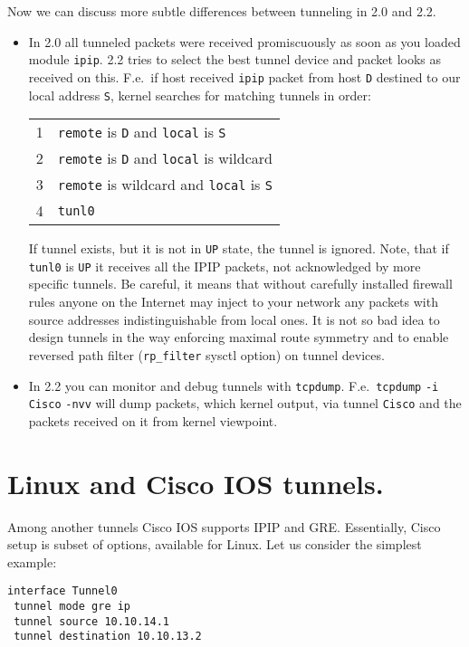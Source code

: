 Now we can discuss more subtle differences between tunneling in 2.0
and 2.2.

\begin{itemize}

\item In 2.0 all tunneled packets were received promiscuously
as soon as you loaded module \verb|ipip|. 2.2 tries to select the best
tunnel device and packet looks as received on this. F.e.\ if host
received \verb|ipip| packet from host \verb|D| destined to our
local address \verb|S|, kernel searches for matching tunnels
in order:

\begin{tabular}{ll}
1 & \verb|remote| is \verb|D| and \verb|local| is \verb|S| \\
2 & \verb|remote| is \verb|D| and \verb|local| is wildcard \\
3 & \verb|remote| is wildcard and \verb|local| is \verb|S| \\
4 & \verb|tunl0|
\end{tabular}

If tunnel exists, but it is not in \verb|UP| state, the tunnel is ignored.
Note, that if \verb|tunl0| is \verb|UP| it receives all the IPIP packets,
not acknowledged by more specific tunnels.
Be careful, it means that without carefully installed firewall rules
anyone on the Internet may inject to your network any packets with
source addresses indistinguishable from local ones. It is not so bad idea
to design tunnels in the way enforcing maximal route symmetry
and to enable reversed path filter (\verb|rp_filter| sysctl option) on
tunnel devices.

\item In 2.2 you can monitor and debug tunnels with \verb|tcpdump|.
F.e.\ \verb|tcpdump| \verb|-i Cisco| \verb|-nvv| will dump packets,
which kernel output, via tunnel \verb|Cisco| and the packets received on it
from kernel viewpoint.

\end{itemize}


\section{Linux and Cisco IOS tunnels.}

Among another tunnels Cisco IOS supports IPIP and GRE.
Essentially, Cisco setup is subset of options, available for Linux.
Let us consider the simplest example:

\begin{verbatim}
interface Tunnel0
 tunnel mode gre ip
 tunnel source 10.10.14.1
 tunnel destination 10.10.13.2
\end{verbatim}


